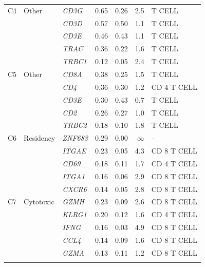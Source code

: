 \begin{table}[ht!]
\begin{tabular}{@{}l l l r r r l@{}}
  \addlinespace[2pt]
  C4 & Other & \textit{CD3G} & 0.65 & 0.26 & 2.5 & T CELL \\
   &  & \textit{CD3D} & 0.57 & 0.50 & 1.1 & T CELL \\
   &  & \textit{CD3E} & 0.46 & 0.43 & 1.1 & T CELL \\
   &  & \textit{TRAC} & 0.36 & 0.22 & 1.6 & T CELL \\
   &  & \textit{TRBC1} & 0.12 & 0.05 & 2.4 & T CELL \\
  \addlinespace[2pt]
  C5 & Other & \textit{CD8A} & 0.38 & 0.25 & 1.5 & T CELL \\
   &  & \textit{CD4} & 0.36 & 0.30 & 1.2 & CD 4 T CELL \\
   &  & \textit{CD3E} & 0.30 & 0.43 & 0.7 & T CELL \\
   &  & \textit{CD2} & 0.26 & 0.27 & 1.0 & T CELL \\
   &  & \textit{TRBC2} & 0.18 & 0.10 & 1.8 & T CELL \\
  \addlinespace[2pt]
  C6 & Residency & \textit{ZNF683} & 0.29 & 0.00 & $\infty$ & -- \\
   &  & \textit{ITGAE} & 0.23 & 0.05 & 4.3 & CD 8 T CELL \\
   &  & \textit{CD69} & 0.18 & 0.11 & 1.7 & CD 4 T CELL \\
   &  & \textit{ITGA1} & 0.16 & 0.06 & 2.9 & CD 8 T CELL \\
   &  & \textit{CXCR6} & 0.14 & 0.05 & 2.8 & CD 8 T CELL \\
  \addlinespace[2pt]
  C7 & Cytotoxic & \textit{GZMH} & 0.23 & 0.09 & 2.6 & CD 8 T CELL \\
   &  & \textit{KLRG1} & 0.20 & 0.12 & 1.6 & CD 4 T CELL \\
   &  & \textit{IFNG} & 0.16 & 0.03 & 4.9 & CD 8 T CELL \\
   &  & \textit{CCL4} & 0.14 & 0.09 & 1.6 & CD 8 T CELL \\
   &  & \textit{GZMA} & 0.13 & 0.11 & 1.2 & CD 8 T CELL \\
  \addlinespace[2pt]
  \bottomrule
  \end{tabular}
\end{table}
